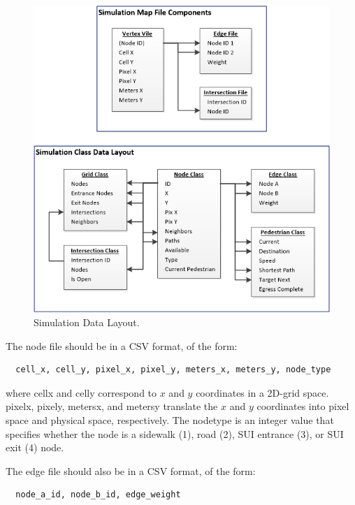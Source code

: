 \documentclass[12pt]{article}
\begin{document}
\begin{figure}[H]
  \includegraphics[width=\linewidth,natwidth=603,natheight=625]{DataLayout.png}
  \caption{Simulation Data Layout.}
  \label{fig:datalayout}
\end{figure}

The node file should be in a CSV format, of the form:

\begin{lstlisting}
  cell_x, cell_y, pixel_x, pixel_y, meters_x, meters_y, node_type
\end{lstlisting}

where cell\textunderscore x and cell\textunderscore y correspond to $x$ and $y$
coordinates in a 2D-grid space. pixel\textunderscore x, pixel\textunderscore y,
meters\textunderscore x, and meters\textunderscore y translate the $x$ and $y$
coordinates into pixel space and physical space, respectively. The
node\textunderscore type is an integer value that specifies whether the node
is a sidewalk (1), road (2), SUI entrance (3), or SUI exit (4) node.

The edge file should also be in a CSV format, of the form:

\begin{lstlisting}
  node_a_id, node_b_id, edge_weight
\end{lstlisting}
\end{document}
